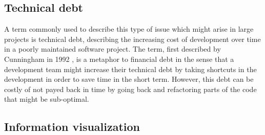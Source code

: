 \subsection{Technical debt}
A term commonly used to describe this type of issue which might arise in large projects is technical debt, describing the increasing cost of development over time in a poorly maintained software project. 
The term, first described by Cunningham in 1992 \cite{cunningham_wycash_1992}, is a metaphor to financial debt in the sense that a development team might increase their technical debt by taking shortcuts in the development in order to save time in the short term.
However, this debt can be costly of not payed back in time by going back and refactoring parts of the code that might be sub-optimal.

\subsection{Information visualization}

